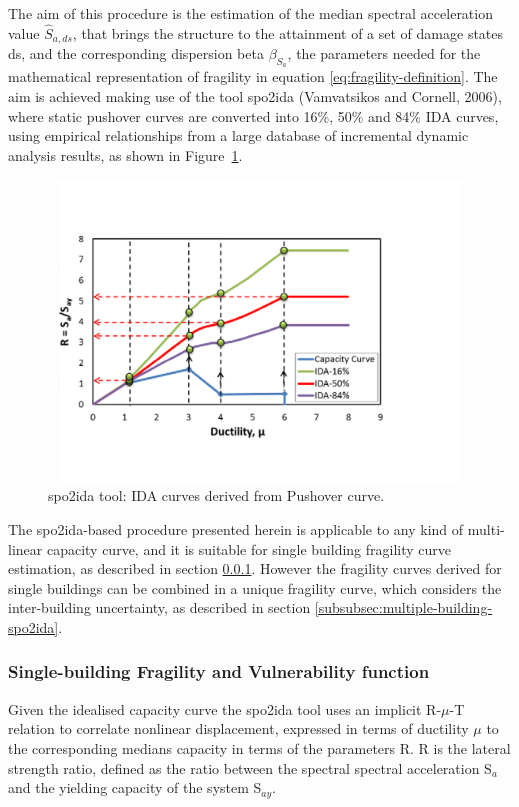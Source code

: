The aim of this procedure is the estimation of the median spectral acceleration value $\hat{S}_{a,ds}$, that brings the structure to the attainment of a set of damage states ds, and the corresponding dispersion beta $\beta_{S_a}$, the parameters needed for the mathematical representation of fragility in equation \ref{eq:fragility-definition}. The aim is achieved making use of the tool spo2ida (Vamvatsikos and Cornell, 2006), where static pushover curves are converted into 16\%, 50\% and 84\% IDA curves, using empirical relationships from a large database of incremental dynamic analysis results, as shown in Figure~\ref{fig:spo2ida}.

\begin{figure}[H]
\centering
\includegraphics[width=12cm,height=8cm]{./figures/spo2ida.jpg}
\caption{spo2ida tool: IDA curves derived from Pushover curve.}
\label{fig:spo2ida}
\end{figure}

The spo2ida-based procedure presented herein is applicable to any kind of multi-linear capacity curve, and it is suitable for single building fragility curve estimation, as described in section \ref{subsubsec:single-building-spo2ida}. However the fragility curves derived for single buildings can be combined in a unique fragility curve, which considers the inter-building uncertainty, as described in section \ref{subsubsec:multiple-building-spo2ida}.

\subsubsection{Single-building Fragility and Vulnerability function}
\label{subsubsec:single-building-spo2ida}
Given the idealised capacity curve the spo2ida tool uses an implicit R-$\mu$-T relation to correlate nonlinear displacement, expressed in terms of ductility $\mu$ to the corresponding medians capacity in terms of the parameters R. R is the lateral strength ratio, defined as the ratio between the spectral spectral acceleration S$_a$ and the yielding capacity of the system S$_{ay}$. 

